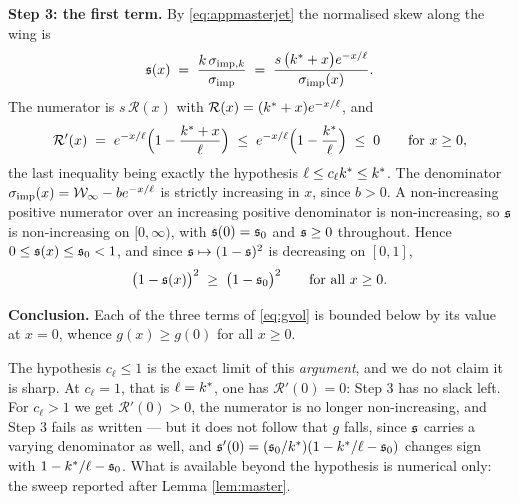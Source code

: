 \medskip
\noindent\textbf{Step 3: the first term.} By \eqref{eq:appmasterjet} the normalised skew along the
wing is
\[
  \mathfrak{s}(x)\;=\;\frac{k\,\sigma_{\mathrm{imp},k}}{\sigma_{\mathrm{imp}}}\;=\;\frac{s\,\bigl(k^{*}+x\bigr)e^{-x/\ell}}{\sigma_{\mathrm{imp}}(x)} .
\]
The numerator is $s\,\mathcal{R}(x)$ with $\mathcal{R}(x)=(k^{*}+x)e^{-x/\ell}$, and
\[
  \mathcal{R}'(x)\;=\;e^{-x/\ell}\Bigl(1-\frac{k^{*}+x}{\ell}\Bigr)\;\le\;e^{-x/\ell}\Bigl(1-\frac{k^{*}}{\ell}\Bigr)\;\le\;0
  \qquad\text{for } x\ge0,
\]
the last inequality being exactly the hypothesis $\ell\le c_{\ell}k^{*}\le k^{*}$. The
denominator $\sigma_{\mathrm{imp}}(x)=\mathcal{W}_{\infty}-be^{-x/\ell}$ is strictly increasing in $x$, since $b>0$. A non-increasing
positive numerator over an increasing positive denominator is non-increasing, so $\mathfrak{s}$ is
non-increasing on $[0,\infty)$, with $\mathfrak{s}(0)=\mathfrak{s}_{0}$ and $\mathfrak{s}\ge0$ throughout. Hence
$0\le\mathfrak{s}(x)\le\mathfrak{s}_{0}<1$, and since $\mathfrak{s}\mapsto(1-\mathfrak{s})^{2}$ is decreasing on $[0,1]$,
\[
  \bigl(1-\mathfrak{s}(x)\bigr)^{2}\;\ge\;\bigl(1-\mathfrak{s}_{0}\bigr)^{2}\qquad\text{for all }x\ge0 .
\]

\medskip
\noindent\textbf{Conclusion.} Each of the three terms of \eqref{eq:gvol} is bounded below by its
value at $x=0$, whence $g(x)\ge g(0)$ for all $x\ge0$.

The hypothesis $c_{\ell}\le1$ is the exact limit of this \emph{argument}, and we do not claim it is
sharp. At $c_{\ell}=1$, that is $\ell=k^{*}$, one has $\mathcal{R}'(0)=0$: Step 3 has no slack
left. For $c_{\ell}>1$ we get $\mathcal{R}'(0)>0$, the numerator is no longer non-increasing, and
Step 3 fails as written --- but it does not follow that $g$ falls, since $\mathfrak{s}$ carries a varying
denominator as well, and $\mathfrak{s}'(0)=(\mathfrak{s}_{0}/k^{*})(1-k^{*}/\ell-\mathfrak{s}_{0})$ changes
sign with $1-k^{*}/\ell-\mathfrak{s}_{0}$. What is available beyond the hypothesis is numerical only:
the sweep reported after Lemma \ref{lem:master}. \qedfilledtext

